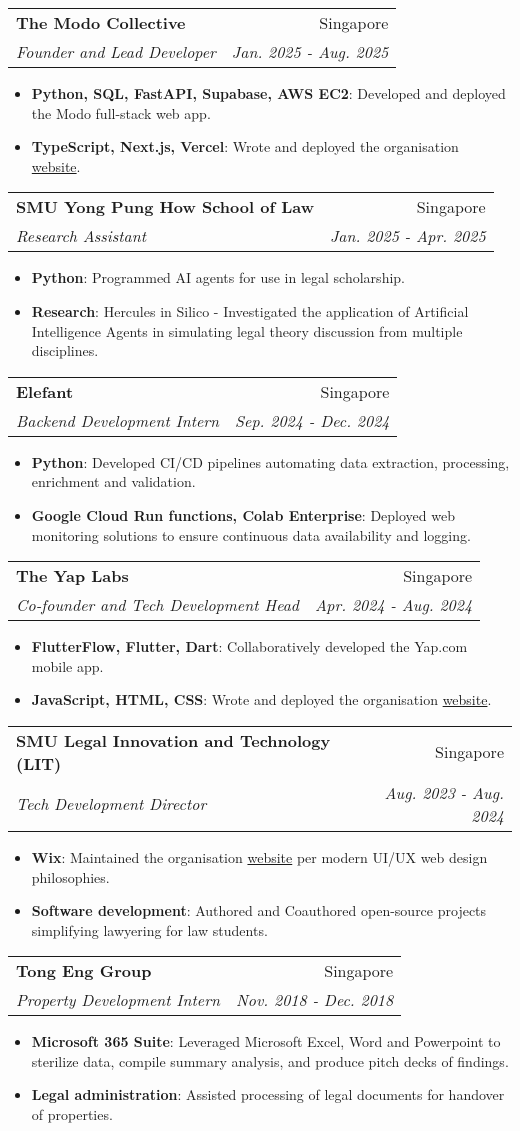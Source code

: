 \documentclass[letterpaper,11pt]{article}
\makeatletter
\newcommand{\resumeItem}[2]{
  \item\small{
    \textbf{#1}{: #2 \vspace{-2pt}}
  }
}
\newcommand{\resumeSubheading}[4]{
  \vspace{-1pt}\item
    \begin{tabular*}{0.97\textwidth}{l@{\extracolsep{\fill}}r}
      \textbf{#1} & #2 \\
      \textit{\small#3} & \textit{\small #4} \\
    \end{tabular*}\vspace{-5pt}
}
\newcommand{\resumeItemListStart}{\begin{itemize}}
\newcommand{\resumeItemListEnd}{\end{itemize}\vspace{-5pt}}
\makeatother
\begin{document}
    \resumeSubheading
      {The Modo Collective}{Singapore}
      {Founder and Lead Developer}{Jan. 2025 - Aug. 2025}
      \resumeItemListStart
        \resumeItem{Python, SQL, FastAPI, Supabase, AWS EC2}
          {Developed and deployed the Modo full-stack web app.}
        \resumeItem{TypeScript, Next.js, Vercel}
          {Wrote and deployed the organisation \href{https://modo-com.vercel.app/}{website}.}
      \resumeItemListEnd

    \resumeSubheading
      {SMU Yong Pung How School of Law}{Singapore}
      {Research Assistant}{Jan. 2025 - Apr. 2025}
      \resumeItemListStart
        \resumeItem{Python}
          {Programmed AI agents for use in legal scholarship.}
        \resumeItem{Research}
          {Hercules in Silico - Investigated the application of Artificial Intelligence Agents in simulating legal theory discussion from multiple disciplines.}
      \resumeItemListEnd

    \resumeSubheading
      {Elefant}{Singapore}
      {Backend Development Intern}{Sep. 2024 - Dec. 2024}
      \resumeItemListStart
        \resumeItem{Python}
          {Developed CI/CD pipelines automating data extraction, processing, enrichment and validation.}
        \resumeItem{Google Cloud Run functions, Colab Enterprise}
          {Deployed web monitoring solutions to ensure continuous data availability and logging.}
      \resumeItemListEnd

    \resumeSubheading
      {The Yap Labs}{Singapore}
      {Co-founder and Tech Development Head}{Apr. 2024 - Aug. 2024}
      \resumeItemListStart
        \resumeItem{FlutterFlow, Flutter, Dart}
          {Collaboratively developed the Yap.com mobile app.}
        \resumeItem{JavaScript, HTML, CSS}
          {Wrote and deployed the organisation \href{https://the-yap-labs.github.io/}{website}.}
      \resumeItemListEnd

    \resumeSubheading
      {SMU Legal Innovation and Technology (LIT)}{Singapore}
      {Tech Development Director}{Aug. 2023 - Aug. 2024}
      \resumeItemListStart
        \resumeItem{Wix}
          {Maintained the organisation \href{https://www.smulit.org/}{website} per modern UI/UX web design philosophies.}
        \resumeItem{Software development}
          {Authored and Coauthored open-source projects simplifying lawyering for law students.}
      \resumeItemListEnd

\resumeSubheading
      {Tong Eng Group}{Singapore}
      {Property Development Intern}{Nov. 2018 - Dec. 2018}
      \resumeItemListStart
        \resumeItem{Microsoft 365 Suite}
          {Leveraged Microsoft Excel, Word and Powerpoint to sterilize data, compile summary analysis, and produce pitch decks of findings.}
        \resumeItem{Legal administration}
          {Assisted processing of legal documents for handover of properties.}
      \resumeItemListEnd
\end{document}
